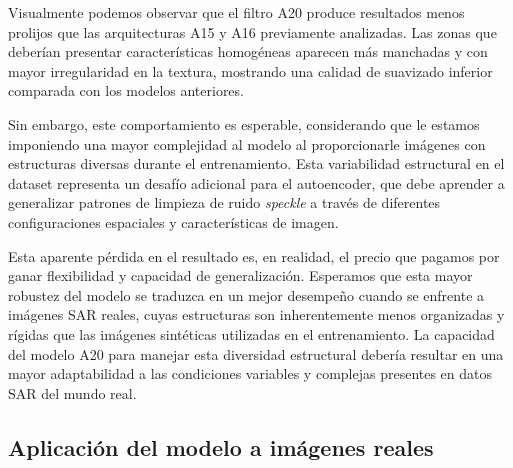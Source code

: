 Visualmente podemos observar que el filtro A20 produce resultados menos prolijos que las arquitecturas A15 y A16 previamente analizadas. Las zonas que deberían presentar características homogéneas aparecen más manchadas y con mayor irregularidad en la textura, mostrando una calidad de suavizado inferior comparada con los modelos anteriores.

Sin embargo, este comportamiento es esperable, considerando que le estamos imponiendo una mayor complejidad al modelo al proporcionarle imágenes con estructuras diversas durante el entrenamiento. Esta variabilidad estructural en el dataset representa un desafío adicional para el autoencoder, que debe aprender a generalizar patrones de limpieza de ruido \emph{speckle} a través de diferentes configuraciones espaciales y características de imagen.

Esta aparente pérdida en el resultado es, en realidad, el precio que pagamos por ganar flexibilidad y capacidad de generalización. Esperamos que esta mayor robustez del modelo se traduzca en un mejor desempeño cuando se enfrente a imágenes SAR reales, cuyas estructuras son inherentemente menos organizadas y rígidas que las imágenes sintéticas utilizadas en el entrenamiento. La capacidad del modelo A20 para manejar esta diversidad estructural debería resultar en una mayor adaptabilidad a las condiciones variables y complejas presentes en datos SAR del mundo real.

\subsection{Aplicación del modelo a imágenes reales}

